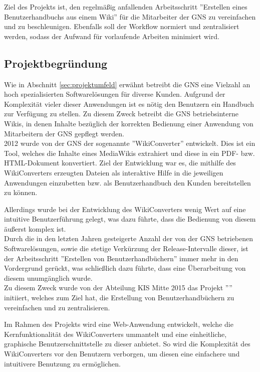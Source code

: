 \documentclass[12pt, xcolor=dvipsnames]{scrartcl}
\begin{document}
Ziel des Projekts ist, den regelmäßig anfallenden Arbeitsschritt ''Erstellen eines Benutzerhandbuchs aus einem Wiki'' für die Mitarbeiter der GNS zu vereinfachen und zu beschleunigen. Ebenfalls soll der Workflow normiert und zentralisiert werden, sodass der Aufwand für vorlaufende Arbeiten minimiert wird.

\subsection{Projektbegründung}
\label{sec:projektbegründung}

Wie in Abschnitt \ref{sec:projektumfeld} erwähnt betreibt die GNS eine Vielzahl an hoch spezialisierten Softwarelösungen für diverse Kunden. Aufgrund der Komplexität vieler dieser Anwendungen ist es nötig den Benutzern ein Handbuch zur Verfügung zu stellen.
Zu diesem Zweck betreibt die GNS betriebsinterne Wikis, in denen Inhalte bezüglich der korrekten Bedienung einer Anwendung von Mitarbeitern der GNS gepflegt werden. \\

2012 wurde von der GNS der sogenannte ''WikiConverter'' entwickelt. Dies ist ein Tool, welches die Inhalte eines MediaWikis extrahiert und diese in ein PDF- bzw. HTML-Dokument konvertiert.
Ziel der Entwicklung war es, die mithilfe des WikiConverters erzeugten Dateien als interaktive Hilfe in die jeweiligen Anwendungen einzubetten bzw. als Benutzerhandbuch den Kunden bereitstellen zu können.

Allerdings wurde bei der Entwicklung des WikiConverters wenig Wert auf eine intuitive Benutzerführung gelegt, was dazu führte, dass die Bedienung von diesem äußerst komplex ist. \\

Durch die in den letzten Jahren gesteigerte Anzahl der von der GNS betriebenen Softwarelösungen, sowie die stetige Verkürzung der Release-Intervalle dieser, ist der Arbeitsschritt ''Erstellen von Benutzerhandbüchern'' immer mehr in den Vordergrund gerückt, was schließlich dazu führte, dass eine Überarbeitung von diesem unumgänglich wurde. \\

Zu diesem Zweck wurde von der Abteilung KIS Mitte 2015 das Projekt ''\Projekt'' initiiert, welches zum Ziel hat, die Erstellung von Benutzerhandbüchern zu vereinfachen und zu zentralisieren.

Im Rahmen des Projekts wird eine Web-Anwendung entwickelt, welche die Kernfunktionalität des WikiConverters ummantelt und eine einheitliche, graphische Benutzerschnittstelle zu dieser anbietet. So wird die Komplexität des WikiConverters vor den Benutzern verborgen, um diesen eine einfachere und intuitivere Benutzung zu ermöglichen. \\
\end{document}
